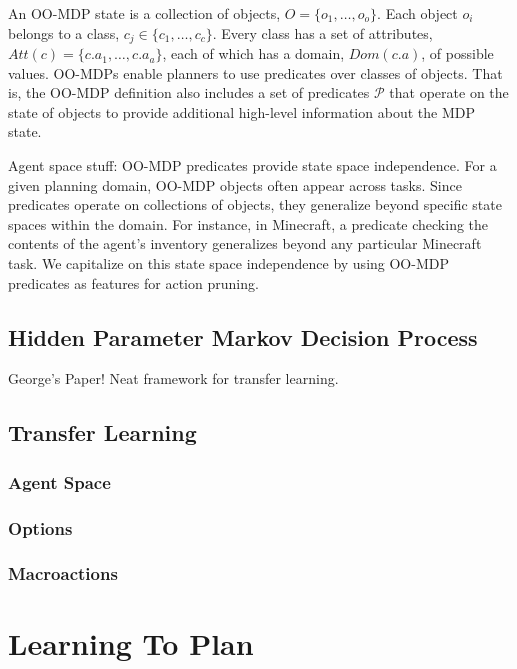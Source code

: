 \documentclass[11pt]{article}
\begin{document}
An OO-MDP state is a collection of objects, $O = \{o_1, \ldots, o_o \}$.  Each object
$o_i$ belongs to a class, $c_j \in \{c_1, \ldots, c_c\}$. Every class
has a set of attributes, $Att(c) = \{c.a_1, \ldots, c.a_a \}$, each of
which has a domain, $Dom(c.a)$, of possible values. OO-MDPs enable
planners to use predicates over classes of objects. That is, the
OO-MDP definition also includes a set of predicates $\mathcal{P}$ that
operate on the state of objects to provide additional high-level
information about the MDP state.

Agent space stuff:
OO-MDP predicates provide state space independence. For a given planning domain, OO-MDP objects
often appear across tasks. Since predicates operate on collections
of objects, they generalize beyond specific state spaces within the domain.
For instance, in Minecraft, a predicate checking the contents of the agent's inventory
generalizes beyond any particular Minecraft task. We capitalize on this state space
independence by using OO-MDP predicates as features for action pruning.


\subsection{Hidden Parameter Markov Decision Process}

George's Paper! Neat framework for transfer learning.\cite{konidaris2014hidden}




\subsection{Transfer Learning}

\subsubsection{Agent Space}
\subsubsection{Options}


\subsubsection{Macroactions}



\section{Learning To Plan}
\label{sec:learn_to_plan}
\end{document}
